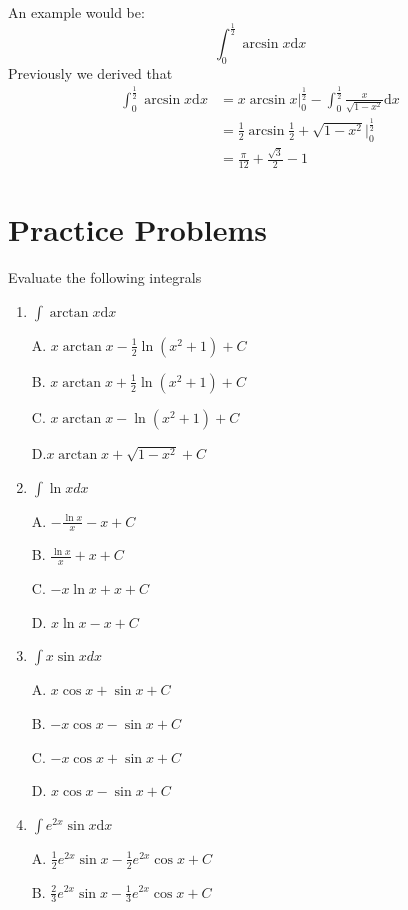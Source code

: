 \documentclass{article}
\numberwithin{equation}{section}
\begin{document}
An example would be:
\[
\int_{0}^{\frac{1}{2}} \arcsin x \mathrm{d}x
\]
Previously we derived that
\begin{align*}
    \int_{0}^{\frac{1}{2}} \arcsin x \mathrm{d}x &= x\arcsin x \Big|_0^{\frac{1}{2}}- \int_{0}^{\frac{1}{2}} \frac{x}{\sqrt{1-x^2}} \mathrm{d}x\\
    &= \frac{1}{2} \arcsin \frac{1}{2} + \sqrt{1-x^2} \Big|_{0}^{\frac{1}{2}}\\
    &= \frac{\pi}{12} + \frac{\sqrt{3}}{2} - 1
\end{align*}

\newpage
\section{Practice Problems}
Evaluate the following integrals
\begin{enumerate}
    \item $\displaystyle\int \arctan{x} \mathrm{d}x$
    
    A. $\displaystyle x\arctan{x} -\frac{1}{2}\ln{(x^2 + 1)} + C$

    B. $\displaystyle x\arctan x + \frac{1}{2}\ln (x^2+1)+C$

    C. $\displaystyle x\arctan{x} - \ln(x^2+1)+C$

    D.$\displaystyle x\arctan{x} + \sqrt{1-x^2} +C$

    \item $\displaystyle \int \ln x dx$
    
    A. $\displaystyle-\frac{\ln x}{x} - x +C$

    B. $\displaystyle\frac{\ln x}{x} + x +C$

    C. $-x\ln x + x +C$

    D. $x\ln x - x +C$

    \item $\displaystyle \int x\sin x dx$
    
    A. $x\cos x + \sin x +C$

    B. $-x\cos x - \sin x +C$

    C. $-x\cos x + \sin x +C$

    D. $x\cos x -\sin x +C$

    \item $\displaystyle \int e^{2x} \sin x \mathrm{d}x$
    
    A. $\displaystyle \frac{1}{2} e^{2x} \sin x - \frac{1}{2}e^{2x} \cos x + C$

    B. $\displaystyle \frac{2}{3}e^{2x}\sin x - \frac{1}{3} e^{2x} \cos x + C$


\end{enumerate}
\end{document}

